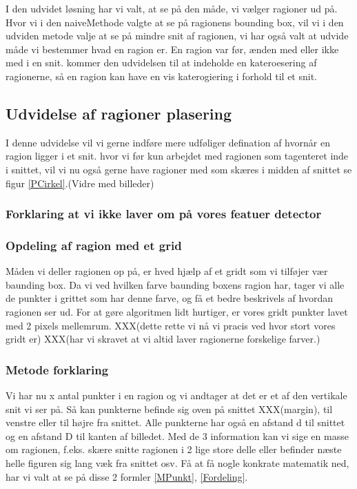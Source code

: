 I den udvidet løsning har vi valt, at se på den måde, vi vælger ragioner
ud på. Hvor vi i den naiveMethode valgte at se på ragionens bounding
box, vil vi i den udviden metode valje at se på mindre snit af ragionen,
vi har også valt at udvide måde vi bestemmer hvad en ragion er. En
ragion var før, ænden med eller ikke med i en snit. kommer den udvidelsen
til at indeholde en kateroesering af ragionerne, så en ragion kan have
en vis katerogiering i forhold til et snit. 

\subsection{Udvidelse af ragioner plasering}
I denne udvidelse vil vi gerne indføre mere udføliger defination af hvornår en ragion ligger i et snit. hvor vi før kun arbejdet med ragionen som tagenteret inde i snittet, vil vi nu også gerne have ragioner med som skæres i midden af snittet se figur \ref{PCirkel}.(Vidre med billeder)

\subsubsection{Forklaring at vi ikke laver om på vores featuer detector}


\subsubsection{Opdeling af ragion med et grid}
Måden vi deller ragionen op på, er hved hjælp af et gridt som vi
tilføjer vær baunding box. Da vi ved hvilken farve baunding boxens
ragion har, tager vi alle de punkter i grittet som har denne farve, og
få et bedre beskrivels af hvordan ragionen ser ud. For at gøre
algoritmen lidt hurtiger, er vores gridt punkter lavet med 2 pixels
mellemrum. XXX(dette rette vi nå vi pracis ved hvor stort vores gridt er)
XXX(har vi skravet at vi altid laver ragionerne forskelige farver.)

\subsubsection{Metode forklaring}
Vi har nu x antal punkter i en ragion og vi andtager at det er et af den
vertikale snit vi ser på. Så kan punkterne befinde sig oven på snittet
XXX(margin), til venstre eller til højre fra snittet. Alle punkterne har
også en afstand d til snittet og en afstand D til kanten af billedet. Med de 3 information kan vi sige en masse
om ragionen, f.eks. skære snitte ragionen i 2 lige store delle eller
befinder næste helle figuren sig lang væk fra snittet osv. Få at få
nogle konkrate matematik ned, har vi valt at se på disse 2 formler
\ref{MPunkt}, \ref{Fordeling}.

